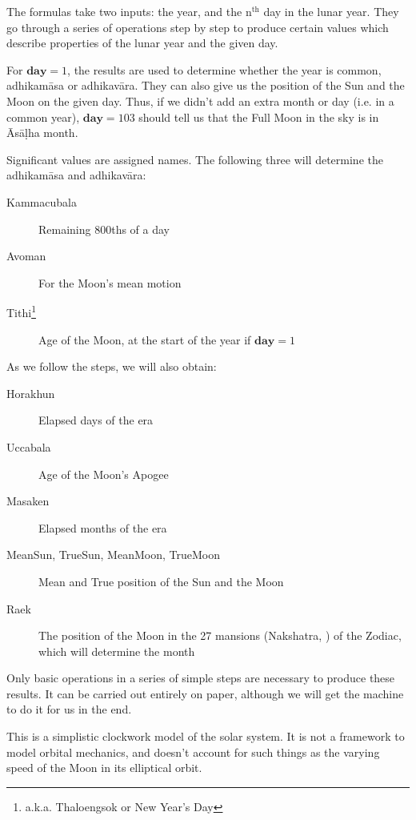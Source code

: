 \documentclass[11pt,oneside]{memoir-article}
\begin{document}
The formulas take two inputs: the year, and the n$^{\text{th}}$ day in the lunar year.
They go through a series of operations step by step to produce certain values
which describe properties of the lunar year and the given day.

For $\mathbf{day} = 1$, the results are used to determine whether the year is
common, adhikamāsa or adhikavāra. They can also give us the position of the Sun
and the Moon on the given day. Thus, if we didn't add an extra month or day
(i.e. in a common year), $\mathbf{day} = 103$ should tell us that the Full Moon
in the sky is in Āsāḷha month.

Significant values are assigned names.\cite{eade1989ephemeris} The following
three will determine the adhikamāsa and adhikavāra:

\savenotes

\begin{description}
\item[{Kammacubala }] Remaining 800ths of a day
\item[{Avoman }] For the Moon's mean motion
\item[{Tithi\footnote{a.k.a. Thaloengsok or New Year's Day} }] Age of the Moon, at the start of the year if $\mathbf{day} = 1$
\end{description}

As we follow the steps, we will also obtain:

\begin{description}
\item[{Horakhun }] Elapsed days of the era
\item[{Uccabala }] Age of the Moon's Apogee
\item[{Masaken }] Elapsed months of the era

\item[{MeanSun, TrueSun, MeanMoon, TrueMoon}] Mean and True position of the Sun and the Moon
\item[{Raek}] The position of the Moon in the 27 mansions (Nakshatra, ) of the Zodiac, which will determine the month
\end{description}

\spewnotes

Only basic operations in a series of simple steps are necessary to produce these
results. It can be carried out entirely on paper, although we will get the
machine to do it for us in the end.

This is a simplistic clockwork model of the solar system. It is not a framework
to model orbital mechanics, and doesn't account for such things as the varying
speed of the Moon in its elliptical orbit.
\end{document}
